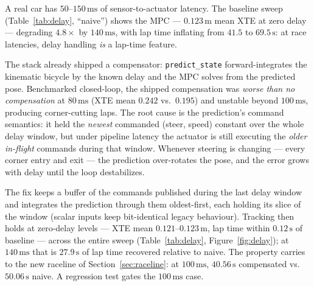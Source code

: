 \documentclass[11pt]{article}
\newcommand{\m}[1]{$#1\,\mathrm{m}$}
\newcommand{\ms}[1]{$#1\,\mathrm{ms}$}
\begin{document}
A real car has $50$--$150\,\mathrm{ms}$ of sensor-to-actuator latency.
The baseline sweep (Table~\ref{tab:delay}, ``naive'') shows the MPC ---
\m{0.123} mean XTE at zero delay --- degrading $4.8\times$ by \ms{140},
with lap time inflating from $41.5$ to $69.5\,\mathrm{s}$: at race
latencies, delay handling \emph{is} a lap-time feature.

The stack already shipped a compensator: \texttt{predict\_state}
forward-integrates the kinematic bicycle by the known delay and the MPC
solves from the predicted pose.  Benchmarked closed-loop, the shipped
compensation was \emph{worse than no compensation} at \ms{80} (XTE mean
$0.242$ vs.\ $0.195$) and unstable beyond \ms{100}, producing
corner-cutting laps.  The root cause is the prediction's command
semantics: it held the \emph{newest} commanded (steer, speed) constant
over the whole delay window, but under pipeline latency the actuator is
still executing the \emph{older in-flight} commands during that window.
Whenever steering is changing --- every corner entry and exit --- the
prediction over-rotates the pose, and the error grows with delay until
the loop destabilizes.

The fix keeps a buffer of the commands published during the last delay
window and integrates the prediction through them oldest-first, each
holding its slice of the window (scalar inputs keep bit-identical
legacy behaviour).  Tracking then holds at zero-delay levels --- XTE
mean $0.121$--$0.123\,\mathrm{m}$, lap time within $0.12\,\mathrm{s}$ of
baseline --- across the entire sweep (Table~\ref{tab:delay},
Figure~\ref{fig:delay}); at \ms{140} that is $27.9\,\mathrm{s}$ of lap
time recovered relative to naive.  The property carries to the new
raceline of Section~\ref{sec:raceline}: at \ms{100}, $40.56\,\mathrm{s}$
compensated vs.\ $50.06\,\mathrm{s}$ naive.  A regression test gates
the \ms{100} case.
\end{document}
